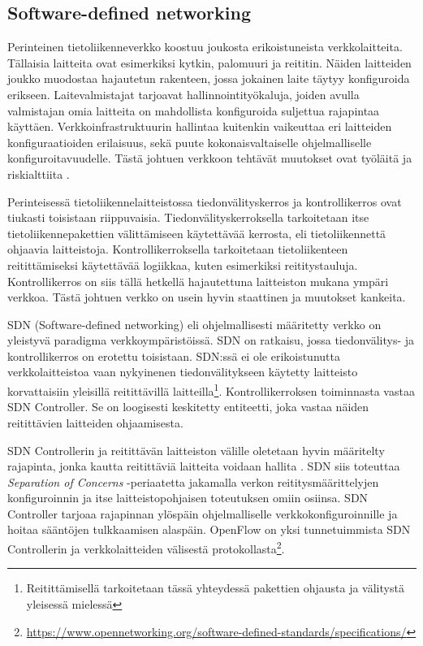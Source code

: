 \subsection{Software-defined networking}
Perinteinen tietoliikenneverkko koostuu joukosta erikoistuneista verkkolaitteita. 
Tällaisia laitteita ovat esimerkiksi kytkin, palomuuri ja reititin. Näiden laitteiden joukko muodostaa hajautetun rakenteen, jossa jokainen laite täytyy konfiguroida erikseen.
Laitevalmistajat tarjoavat hallinnointityökaluja, joiden avulla valmistajan omia laitteita on mahdollista konfiguroida suljettua rajapintaa käyttäen. Verkkoinfrastruktuurin hallintaa kuitenkin vaikeuttaa eri laitteiden konfiguraatioiden erilaisuus, sekä puute kokonaisvaltaiselle ohjelmalliselle konfiguroitavuudelle.
Tästä johtuen verkkoon tehtävät muutokset ovat työläitä ja riskialttiita \cite{kreutz2015software}.

Perinteisessä tietoliikennelaitteistossa tiedonvälityskerros ja kontrollikerros ovat tiukasti toisistaan riippuvaisia. Tiedonvälityskerroksella tarkoitetaan itse tietoliikennepakettien välittämiseen käytettävää kerrosta, eli tietoliikennettä ohjaavia laitteistoja. Kontrollikerroksella tarkoitetaan tietoliikenteen reitittämiseksi käytettävää logiikkaa, kuten esimerkiksi reititystauluja. Kontrollikerros on siis tällä hetkellä hajautettuna laitteiston mukana ympäri verkkoa. Tästä johtuen verkko on usein hyvin staattinen ja muutokset kankeita.

SDN (Software-defined networking) eli ohjelmallisesti määritetty verkko on yleistyvä paradigma verkkoympäristöissä.  SDN on ratkaisu, jossa tiedonvälitys- ja kontrollikerros on erotettu toisistaan. SDN:ssä ei ole erikoistunutta verkkolaitteistoa vaan nykyinenen tiedonvälitykseen käytetty laitteisto korvattaisiin yleisillä reitittävillä laitteilla\footnote{Reitittämisellä tarkoitetaan tässä yhteydessä pakettien ohjausta ja välitystä yleisessä mielessä}. Kontrollikerroksen toiminnasta vastaa SDN Controller. Se on loogisesti keskitetty entiteetti, joka vastaa näiden reitittävien laitteiden ohjaamisesta.

SDN Controllerin ja reitittävän laitteiston välille oletetaan hyvin määritelty rajapinta, jonka kautta reitittäviä laitteita voidaan hallita \cite{kreutz2015software}. SDN siis toteuttaa \textit{Separation of Concerns} -periaatetta jakamalla verkon reititysmäärittelyjen konfiguroinnin ja itse laitteistopohjaisen toteutuksen omiin osiinsa. SDN Controller tarjoaa rajapinnan ylöspäin ohjelmalliselle verkkokonfiguroinnille ja hoitaa sääntöjen tulkkaamisen alaspäin. OpenFlow on yksi tunnetuimmista SDN Controllerin ja verkkolaitteiden välisestä protokollasta\footnote{\url{https://www.opennetworking.org/software-defined-standards/specifications/}}.

